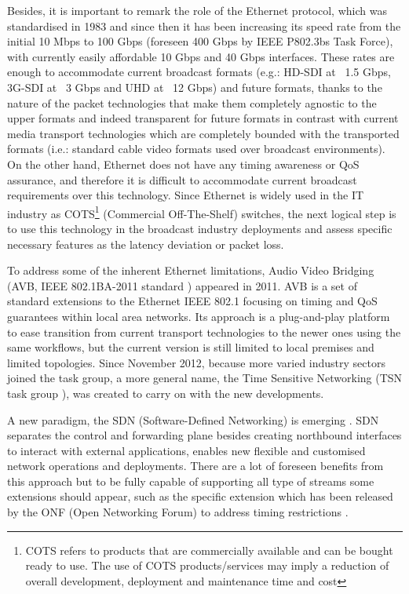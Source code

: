 Besides, it is important to remark the role of the Ethernet \cite{eth} protocol, which was standardised in 1983 and since then it has been increasing its speed rate from the initial 10 Mbps to 100 Gbps (foreseen 400 Gbps by IEEE P802.3bs \cite{ethbs} Task Force), with currently easily affordable 10 Gbps and 40 Gbps interfaces. These rates are enough to accommodate current broadcast formats (e.g.: HD-SDI at ~1.5 Gbps, 3G-SDI at ~3 Gbps and UHD at ~12 Gbps) and future formats, thanks to the nature of the packet technologies that make them completely agnostic to the upper formats and indeed transparent for future formats in contrast with current media transport technologies which are completely bounded with the transported formats (i.e.: standard cable video formats used over broadcast environments). On the other hand, Ethernet does not have any timing awareness or QoS assurance, and therefore it is difficult to accommodate current broadcast requirements over this technology. Since Ethernet is widely used in the IT industry as COTS\footnote{COTS refers to products that are commercially available and can be bought ready to use. The use of COTS products/services may imply a reduction of overall development, deployment and maintenance time and cost} (Commercial Off-The-Shelf) switches, the next logical step is to use this technology in the broadcast industry deployments and assess specific necessary features as the latency deviation or packet loss.

To address some of the inherent Ethernet limitations, Audio Video Bridging (AVB, IEEE 802.1BA-2011 standard \cite{avb}) appeared in 2011. AVB is a set of standard extensions to the Ethernet IEEE 802.1 \cite{8021} focusing on timing and QoS guarantees within local area networks. Its approach is a plug-and-play platform to ease transition from current transport technologies to the newer ones using the same workflows, but the current version is still limited to local premises and limited topologies. Since November 2012, because more varied industry sectors joined the task group, a more general name, the Time Sensitive Networking (TSN task group \cite{tsn}), was created to carry on with the new developments.

A new paradigm, the SDN (Software-Defined Networking) is emerging \cite{sdn}. SDN separates the control and forwarding plane besides creating northbound interfaces to interact with external applications, enables new flexible and customised network operations and deployments. There are a lot of foreseen benefits from this approach but to be fully capable of supporting all type of streams some extensions should appear, such as the specific extension which has been released by the ONF (Open Networking Forum) to address timing restrictions \cite{sdn}.

